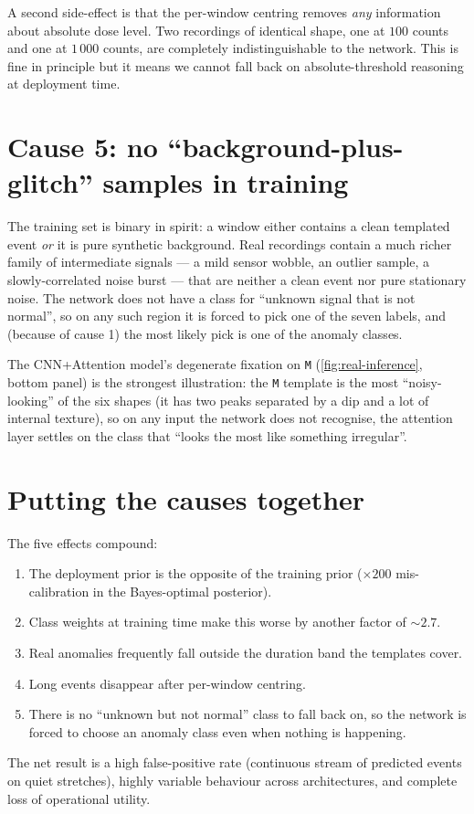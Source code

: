 A second side-effect is that the per-window centring removes \emph{any}
information about absolute dose level. Two recordings of identical
shape, one at $100$ counts and one at $1\,000$ counts, are completely
indistinguishable to the network. This is fine in principle but it
means we cannot fall back on absolute-threshold reasoning at deployment
time.

\section{Cause 5: no ``background-plus-glitch'' samples in training}
\label{sec:fail-boundary}

The training set is binary in spirit: a window either contains a clean
templated event \emph{or} it is pure synthetic background. Real
recordings contain a much richer family of intermediate signals --- a
mild sensor wobble, an outlier sample, a slowly-correlated noise burst
--- that are neither a clean event nor pure stationary noise. The
network does not have a class for ``unknown signal that is not
normal'', so on any such region it is forced to pick one of the seven
labels, and (because of cause 1) the most likely pick is one of the
anomaly classes.

The CNN+Attention model's degenerate fixation on \texttt{M}
(\cref{fig:real-inference}, bottom panel) is the strongest illustration:
the \texttt{M} template is the most ``noisy-looking'' of the six
shapes (it has two peaks separated by a dip and a lot of internal
texture), so on any input the network does not recognise, the
attention layer settles on the class that ``looks the most like
something irregular''.

\section{Putting the causes together}
\label{sec:fail-together}

The five effects compound:
\begin{enumerate}[leftmargin=*, itemsep=0.2em]
    \item The deployment prior is the opposite of the training prior
    ($\times 200$ mis-calibration in the Bayes-optimal posterior).
    \item Class weights at training time make this worse by another
    factor of $\sim 2.7$.
    \item Real anomalies frequently fall outside the duration band the
    templates cover.
    \item Long events disappear after per-window centring.
    \item There is no ``unknown but not normal'' class to fall back on,
    so the network is forced to choose an anomaly class even when
    nothing is happening.
\end{enumerate}
The net result is a high false-positive rate (continuous stream of
predicted events on quiet stretches), highly variable behaviour across
architectures, and complete loss of operational utility.

